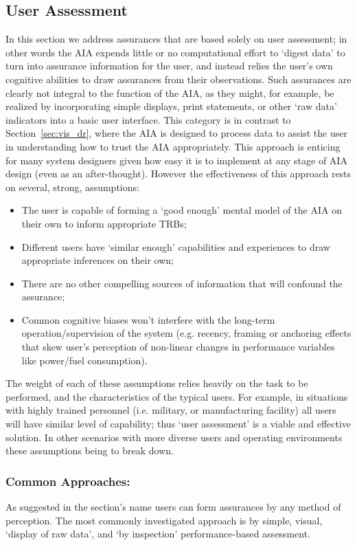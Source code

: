 \subsection{User Assessment} \label{sec:user_assessment}
In this section we address assurances that are based solely on user assessment; in other words the AIA expends little or no computational effort to `digest data' to turn into assurance information for the user, and instead relies the user's own cognitive abilities to draw assurances from their observations. Such assurances are clearly not integral to the function of the AIA, as they might, for example, be realized by incorporating simple displays, print statements, or other `raw data' indicators into a basic user interface. 
This category is in contrast to Section~\ref{sec:vis_dr}, where the AIA is designed to process data to assist the user in understanding how to trust the AIA appropriately. This approach is enticing for many system designers given how easy it is to implement at any stage of AIA design (even as an after-thought). However the effectiveness of this approach rests on several, strong, assumptions:

\begin{itemize}
    \item The user is capable of forming a `good enough' mental model of the AIA on their own to inform appropriate TRBs;
    \item Different users have `similar enough' capabilities and experiences to draw appropriate inferences on their own;
    \item There are no other compelling sources of information that will confound the assurance;
    \item Common cognitive biases won't interfere with the long-term operation/supervision of the system (e.g. recency, framing or anchoring effects that skew user's perception of non-linear changes in performance variables like power/fuel consumption). 
\end{itemize}

The weight of each of these assumptions relies heavily on the task to be performed, and the characteristics of the typical users. For example, in situations with highly trained personnel (i.e. military, or manufacturing facility) all users will have similar level of capability; thus `user assessment' is a viable and effective solution. 
In other scenarios with more diverse users and operating environments these assumptions being to break down. 

\subsubsection{Common Approaches:}
As suggested in the section's name users can form assurances by any method of perception. The most commonly investigated approach is by simple, visual, `display of raw data', and `by inspection' performance-based assessment. 

